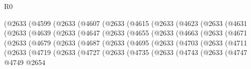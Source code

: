 \begin{lexlean}{R0}
\begin{coremodule}
              (@2633
                (@4599
                  (@2633
                    (@4607
                      (@2633
                        (@4615
                          (@2633
                            (@4623
                              (@2633
                                (@4631
                                  (@2633
                                    (@4639
                                      (@2633
                                        (@4647
                                          (@2633
                                            (@4655
                                              (@2633
                                                (@4663
                                                  (@2633
                                                    (@4671
                                                      (@2633
                                                        (@4679
                                                          (@2633
                                                            (@4687
                                                              (@2633
                                                                (@4695
                                                                  (@2633
                                                                    (@4703
                                                                      (@2633
                                                                        (@4711
                                                                          (@2633
                                                                            (@4719
                                                                              (@2633
                                                                                (@4727
                                                                                  (@2633
                                                                                    (@4735
                                                                                      (@2633
                                                                                        (@4743
                                                                                          (@2633
                                                                                            (@4747
                                                                                              @4749
                                                                                              @2654

\end{coremodule}
\end{lexlean}
